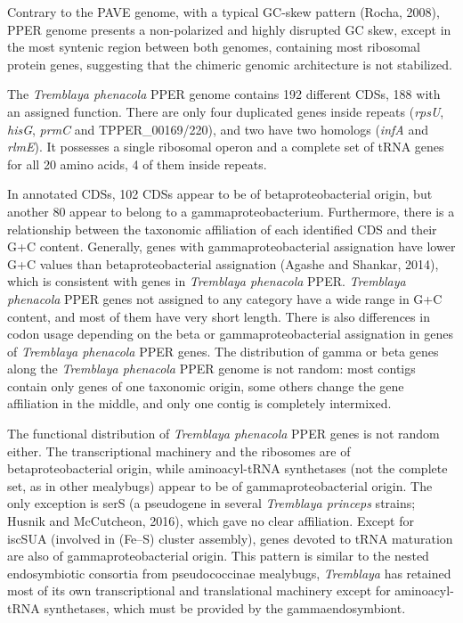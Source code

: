 \documentclass[11pt]{article}
\begin{document}
\begin{sloppypar}
Contrary to the PAVE genome, with a typical GC-skew pattern (Rocha, 2008), PPER genome presents a non-polarized and highly disrupted GC skew, except in the most syntenic region between both genomes, containing most ribosomal protein genes, suggesting that the chimeric genomic architecture is not stabilized.
\par
The \textit{Tremblaya phenacola} PPER genome contains 192 different CDSs, 188 with an assigned function. 
There are only four duplicated genes inside repeats (\textit{rpsU}, \textit{hisG}, \textit{prmC} and TPPER_00169/220), and two
have two homologs (\textit{infA} and \textit{rlmE}). 
It possesses a single ribosomal operon and a complete set of tRNA genes for all 20 amino acids, 4 of them inside repeats. 
\par
In annotated CDSs, 102 CDSs appear to be of betaproteobacterial origin, but another 80 appear to belong to a gammaproteobacterium. 
Furthermore, there is a relationship between the taxonomic affiliation of each identified CDS and their G+C content. 
Generally, genes with gammaproteobacterial assignation have lower G+C values than betaproteobacterial assignation (Agashe and Shankar, 2014), which is consistent with genes in \textit{Tremblaya phenacola} PPER. 
\textit{Tremblaya phenacola} PPER genes not assigned to any category have a wide range in G+C content, and most
of them have very short length. 
There is also differences in codon usage depending on the beta or gammaproteobacterial assignation in genes of \textit{Tremblaya phenacola} PPER genes. 
The distribution of gamma or beta genes along the \textit{Tremblaya phenacola} PPER genome is not random: most contigs contain only genes of one taxonomic origin, some others change the gene affiliation in the middle, and only one contig 
is completely intermixed. 
\par
The functional distribution of \textit{Tremblaya phenacola} PPER genes is not random either. 
The transcriptional machinery and the ribosomes are of betaproteobacterial origin, while aminoacyl-tRNA synthetases (not the complete set, as in other mealybugs) appear to be of gammaproteobacterial origin. 
The only exception is serS (a pseudogene in several \textit{Tremblaya princeps} strains; Husnik and McCutcheon, 2016), which gave no clear affiliation. 
Except for iscSUA (involved in (Fe–S) cluster assembly), genes devoted to tRNA maturation are also of gammaproteobacterial origin. 
This pattern is similar to the nested endosymbiotic consortia from pseudococcinae mealybugs, \textit{Tremblaya} has retained most of its own transcriptional and translational machinery except for aminoacyl-tRNA synthetases, which must be provided by the gammaendosymbiont. 

\end{sloppypar}
\end{document}
